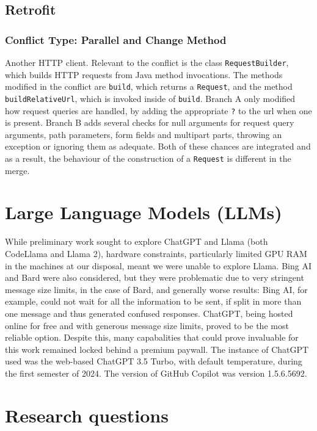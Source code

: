 \subsection{Retrofit}

\subsubsection{Conflict Type: Parallel and Change Method}

Another HTTP client. Relevant to the conflict is the class \texttt{RequestBuilder}, which builds HTTP requests from Java method invocations. The methods modified
in the conflict are \texttt{build}, which returns a \texttt{Request}, and the method \texttt{buildRelativeUrl}, which is invoked inside of \texttt{build}.
Branch A only modified how request queries are handled, by adding the appropriate \texttt{?} to the url when one is present.
Branch B adds several checks for null arguments for request query arguments, path parameters, form fields and multipart parts, throwing an exception or ignoring them as adequate.
Both of these chances are integrated and as a result, the behaviour of the construction of a \texttt{Request} is different in the merge.

\section{Large Language Models (LLMs)}

While preliminary work sought to explore ChatGPT and Llama (both CodeLlama and Llama 2), hardware constraints, particularly limited GPU RAM in the machines at our disposal, meant we were unable to explore Llama.  Bing AI and Bard were also considered, but they were problematic due to very stringent message size limits, in the case of Bard, and generally worse results: Bing AI, for example, could not wait for all the information to be sent, if split in more than one message and thus generated confused responses. ChatGPT, being hosted online for free and with generous message size limits, proved to be the most reliable option. Despite this, many capabalities that could prove invaluable for this work remained locked behind a premium paywall.
The instance of ChatGPT used was the web-based ChatGPT 3.5 Turbo, with default temperature, during the first semester of 2024.
The version of GitHub Copilot was version 1.5.6.5692.

\section{Research questions}

